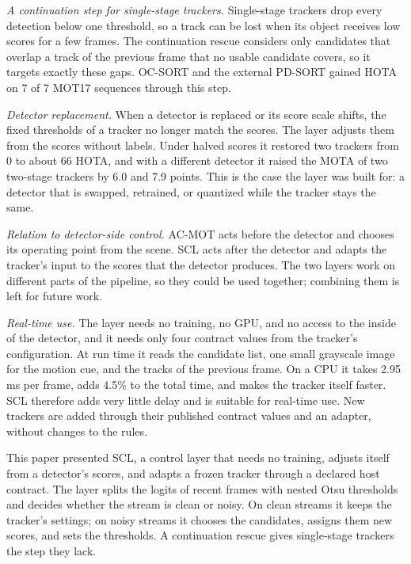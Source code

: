 \documentclass[pdflatex,sn-mathphys-num,iicol]{sn-jnl}
\makeatletter
\def\sectionfont{\reset@font\fontfamily{\rmdefault}\fontsize{11bp}{13bp}\bfseries\selectfont\raggedright\boldmath}
\renewcommand\section{\@startsection{section}{1}{\z@}{-8pt \@plus -2pt \@minus -2pt}{4pt}{\sectionfont}}
\newcommand{\scl}{SCL}
\makeatother
\begin{document}
\emph{A continuation step for single-stage trackers.} Single-stage trackers
drop every detection below one threshold, so a track can be lost when its
object receives low scores for a few frames. The continuation rescue
considers only candidates that overlap a track of the previous frame that no
usable candidate covers, so it targets exactly these gaps. OC-SORT and the
external PD-SORT gained HOTA on 7 of 7 MOT17 sequences through this step.

\emph{Detector replacement.} When a detector is replaced or its score scale
shifts, the fixed thresholds of a tracker no longer match the scores. The
layer adjusts them from the scores without labels. Under halved scores it
restored two trackers from 0 to about 66 HOTA, and with a different detector
it raised the MOTA of two two-stage trackers by 6.0 and 7.9 points. This is
the case the layer was built for: a detector that is swapped, retrained, or
quantized while the tracker stays the same.

\emph{Relation to detector-side control.} AC-MOT \cite{ismail2026acmot} acts
before the detector and chooses its operating point from the scene. \scl{}
acts after the detector and adapts the tracker's input to the scores that the
detector produces. The two layers work on different parts of the pipeline,
so they could be used together; combining them is left for future work.

\emph{Real-time use.} The layer needs no training, no GPU, and no access to
the inside of the detector, and it needs only four contract values from the
tracker's configuration. At run time it reads the candidate list, one small
grayscale image for the motion cue, and the tracks of the previous frame. On
a CPU it takes 2.95 ms per frame, adds 4.5\% to the total time, and makes the
tracker itself faster. \scl{} therefore adds very little delay and is
suitable for real-time use. New trackers are added through their published
contract values and an adapter, without changes to the rules.
\section{Conclusion}\label{sec:conclusion}

This paper presented \scl{}, a control layer that needs no training, adjusts
itself from a detector's scores, and adapts a frozen tracker through a
declared host contract. The layer splits the logits of recent frames with
nested Otsu thresholds and decides whether the stream is clean or noisy. On
clean streams it keeps the tracker's settings; on noisy streams it chooses
the candidates, assigns them new scores, and sets the thresholds. A
continuation rescue gives single-stage trackers the step they lack.
\end{document}
